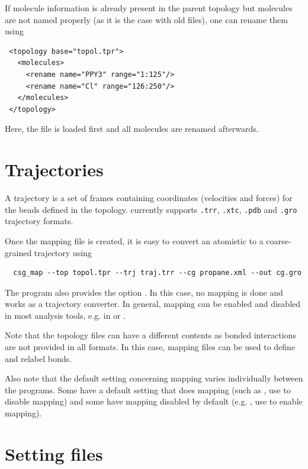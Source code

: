 If molecule information is already present in the parent topology but molecules are not named properly (as it is the case with old \gromacs {} files), one can rename them using
\begin{lstlisting}
 <topology base="topol.tpr">
   <molecules>
     <rename name="PPY3" range="1:125"/>
     <rename name="Cl" range="126:250"/>
   </molecules>
 </topology>
\end{lstlisting}
Here, the file  is loaded first and all molecules are renamed afterwards.

\section{Trajectories}
\label{sec:trajectory}

A trajectory is a set of frames containing coordinates (velocities and forces) for the beads defined in the topology. \votca currently supports \texttt{.trr}, \texttt{.xtc}, \texttt{.pdb} and \texttt{.gro} trajectory formats.

Once the mapping file is created, it is easy to convert an atomistic to a coarse-grained trajectory using 
\begin{verbatim}
  csg_map --top topol.tpr --trj traj.trr --cg propane.xml --out cg.gro
\end{verbatim}

The program  also provides the option . In this case, no mapping is done and  works as a trajectory converter. In general, mapping can be enabled and disabled in most analysis tools, e.g. in  or .

Note that the topology files can have a different contents as bonded interactions are not provided in all formats. In this case, mapping files can be used to define and relabel bonds.

Also note that the default setting concerning mapping varies individually between the programs. Some have a default setting that does mapping (such as , use  to disable mapping) and some have mapping disabled by default (e.g. , use  to enable mapping).

\section{Setting files}
\label{sec:setting_files}

